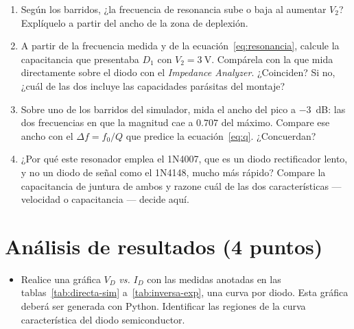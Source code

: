 \documentclass[11pt,a4paper]{article}
\newcommand{\puntos}[1]{\normalfont\normalsize\textmd{(#1 puntos)}}
\begin{document}
\begin{enumerate}[label=\arabic*., leftmargin=2em]
    \item Según los barridos, ¿la frecuencia de resonancia sube o baja al
          aumentar $V_2$? Explíquelo a partir del ancho de la zona de deplexión.
    \item A partir de la frecuencia medida y de la ecuación~\eqref{eq:resonancia},
          calcule la capacitancia que presentaba $D_1$ con $V_2 = \qty{3}{\volt}$.
          Compárela con la que mida directamente sobre el diodo con el
          \emph{Impedance Analyzer}. ¿Coinciden? Si no, ¿cuál de las dos incluye las
          capacidades parásitas del montaje?
    \item Sobre uno de los barridos del simulador, mida el ancho del pico a
          $-3$~dB: las dos frecuencias en que la magnitud cae a $\num{0.707}$ del
          máximo. Compare ese ancho con el $\Delta f = f_0/Q$ que predice la
          ecuación~\eqref{eq:q}. ¿Concuerdan?
    \item ¿Por qué este resonador emplea el 1N4007, que es un diodo rectificador lento,
          y no un diodo de señal como el 1N4148, mucho más rápido? Compare la
          capacitancia de juntura de ambos y razone cuál de las dos características
          --- velocidad o capacitancia --- decide aquí.
\end{enumerate}

\FloatBarrier
\section{Análisis de resultados \puntos{4}}
\label{sec:analisis}
\begin{itemize}
    \item Realice una gráfica $V_D$ \emph{vs.} $I_D$ con las medidas anotadas en las
          tablas~\ref{tab:directa-sim} a~\ref{tab:inversa-exp}, una curva por diodo. Esta gráfica
          deberá ser generada con Python. Identificar las regiones de la curva característica del
          diodo semiconductor.
\end{itemize}
\end{document}
